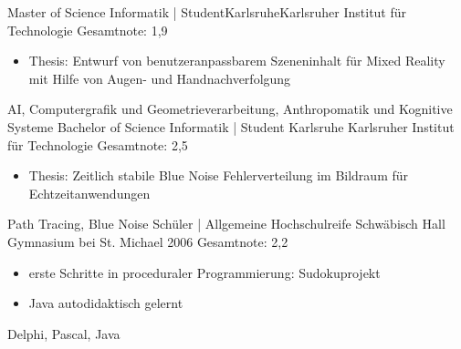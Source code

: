 {    
    \begin{experiences}
    \education
    {
    }   {Master of Science Informatik | Student}{Karlsruhe}{Karlsruher Institut für Technologie}
    {
    }
    {Gesamtnote: 1,9}
    {
        \begin{itemize}
            \item Thesis: Entwurf von benutzeranpassbarem Szeneninhalt für Mixed Reality mit Hilfe von Augen- und Handnachverfolgung
        \end{itemize}
    }
    {AI, Computergrafik und Geometrieverarbeitung, Anthropomatik und Kognitive Systeme}
    \emptySeparator
    {Bachelor of Science Informatik | Student}
    {Karlsruhe}
    {Karlsruher Institut für Technologie}
    { 
    }
    {Gesamtnote: 2,5}
    {
    \begin{itemize}
        \item Thesis: Zeitlich stabile Blue Noise Fehlerverteilung im Bildraum für Echtzeitanwendungen
    \end{itemize}
    }
    {Path Tracing, Blue Noise}
    \emptySeparator
    {Schüler | Allgemeine Hochschulreife}
    {Schwäbisch Hall}
    {Gymnasium bei St. Michael}
    {2006}
    {Gesamtnote: 2,2}
    {\begin{itemize}
        \item erste Schritte in proceduraler Programmierung: Sudokuprojekt
        \item Java autodidaktisch gelernt
    \end{itemize}}
    {Delphi, Pascal, Java}
    
    \end{experiences}
}
  


